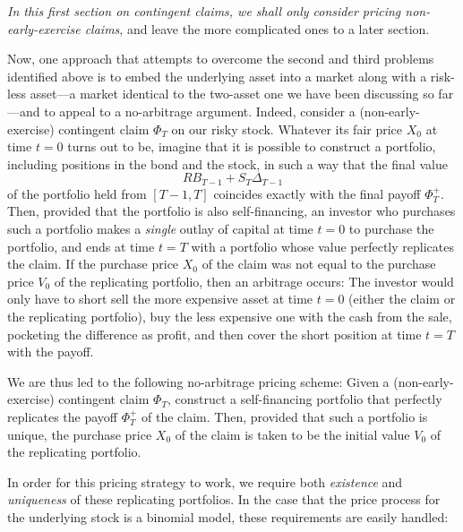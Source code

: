 \documentclass[11pt, openany, oneside]{book}
\theoremstyle{definition}
\theoremstyle{remark}
\theoremstyle{boldital}
\numberwithin{equation}{section}
\begin{document}
\textit{In this first section on contingent claims, we shall only consider pricing non-early-exercise claims}, and leave the more complicated ones to a later section.

Now, one approach that attempts to overcome the second and third problems identified above is to embed the underlying asset into a market along with a risk-less asset---a market identical to the two-asset one we have been discussing so far---and to appeal to a no-arbitrage argument. Indeed, consider a (non-early-exercise) contingent claim $\Phi_T$ on our risky stock. Whatever its fair price $X_0$ at time $t=0$ turns out to be, imagine that it is possible to construct a portfolio, including positions in the bond and the stock, in such a way that the final value
	\[
	RB_{T-1} + S_{T} \Delta_{T-1}
	\]
of the portfolio held from $[T-1, T]$ coincides exactly with the final payoff $\Phi_T^+$. Then, provided that the portfolio is also self-financing, an investor who purchases such a portfolio makes a \textit{single} outlay of capital at time $t=0$ to purchase the portfolio, and ends at time $t=T$ with a portfolio whose value perfectly replicates the claim. If the purchase price $X_0$ of the claim was not equal to the purchase price $V_0$ of the replicating portfolio, then an arbitrage occurs: The investor would only have to short sell the more expensive asset at time $t=0$ (either the claim or the replicating portfolio), buy the less expensive one with the cash from the sale, pocketing the difference as profit, and then cover the short position at time $t=T$ with the payoff.

We are thus led to the following no-arbitrage pricing scheme: Given a (non-early-exercise) contingent claim $\Phi_T$, construct a self-financing portfolio that perfectly replicates the payoff $\Phi_T^+$ of the claim. Then, provided that such a portfolio is unique, the purchase price $X_0$ of the claim is taken to be the initial value $V_0$ of the replicating portfolio.

In order for this pricing strategy to work, we require both \textit{existence} and \textit{uniqueness} of these replicating portfolios. In the case that the price process for the underlying stock is a binomial model, these requirements are easily handled:
\end{document}
